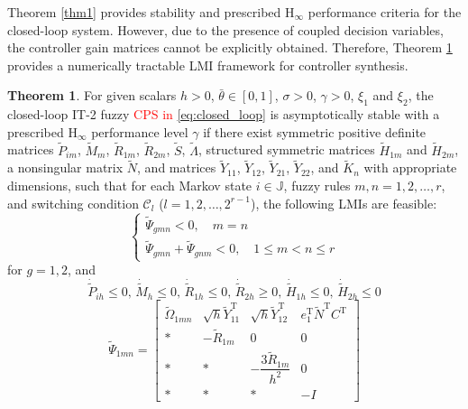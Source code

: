 \documentclass[preprint,review,fleqn,sort&compress,3p]{elsarticle}
\theoremstyle{definition} %
\theoremstyle{definition}%
\newtheorem{thm}{Theorem}[section]
\begin{document}
	Theorem \ref{thm1} provides stability and prescribed $\mathrm{H}_{\infty}$ performance criteria for the closed-loop system.
	However, due to the presence of coupled decision variables, the controller gain matrices cannot be explicitly obtained. Therefore, Theorem \ref{thm2} provides a numerically tractable LMI framework for controller synthesis.
	\begin{thm}\label{thm2}
		For given scalars $h > 0$, $\bar{\theta} \in [0,1]$, $\sigma > 0$, $\gamma > 0$, $\xi_1$ and $\xi_2$, the closed-loop IT-2 fuzzy \textcolor{red}{CPS in} \eqref{eq:closed_loop} is asymptotically stable with a prescribed $\mathrm{H}_\infty$ performance level $\gamma$ if there exist symmetric positive definite matrices $\tilde{P}_{im}$, $\tilde{M}_{m}$, $\tilde{R}_{1m}$, $\tilde{R}_{2m}$, $\tilde{S}$, $\tilde{\Lambda}$, structured symmetric matrices $\tilde{H}_{1m}$ and $\tilde{H}_{2m}$, a nonsingular matrix $\tilde{N}$, and matrices $\tilde{Y}_{11}$, $\tilde{Y}_{12}$, $\tilde{Y}_{21}$, $\tilde{Y}_{22}$, and $\widetilde{K}_n$ with appropriate dimensions, such that for each Markov state $i \in \mathbb{J}$, fuzzy rules $m,n = 1,2,\ldots,r$, and switching condition $\mathcal{C}_l$ ($l = 1,2,\ldots,2^{r-1}$), the following LMIs are feasible:
		\begin{equation}\label{shucr1_not}
			\begin{cases}
				\widetilde{\Psi}_{gmn} < 0 	,\quad  m=n  \\
				\widetilde{\Psi}_{gmn} + \widetilde{\Psi}_{gnm} < 0,\quad 1 \le m 	< n \le r
			\end{cases}
		\end{equation}
		for $g=1,2$, and
		\begin{equation}\label{dot_hat_small_0}
			\dot{\widetilde{P}}_{ih} \leq 0, \, 
			\dot{\widetilde{M}}_{h} \leq 0, \, 
			\dot{\widetilde{R}}_{1h} \leq 0, \, 
			\dot{\widetilde{R}}_{2h} \geq 0, \, 
			\dot{\widetilde{H}}_{1h} \leq 0, \, 
			\dot{\widetilde{H}}_{2h} \leq 0
		\end{equation}
		\begin{equation}\label{LMI1_not}
			\widetilde{\Psi}_{1mn} =
			\begin{bmatrix}
				\widetilde{\Omega}_{1mn} & \sqrt{h} \widetilde{Y}_{11}^{\mathrm{T}} & \sqrt{h} \widetilde{Y}_{12}^{\mathrm{T}} & e_1^{\mathrm{T}} \widetilde{N}^{\mathrm{T}} {C}^{\mathrm{T}}\\[1.5ex]
				* & -\widetilde{R}_{1m} & 0 & 0 \\[1.5ex]
				* & * & -\dfrac{3\widetilde{R}_{1m}}{h^2} & 0\\[1.5ex]
				* & * & * & -I
			\end{bmatrix}
		\end{equation}
		

\end{thm}
\end{document}
